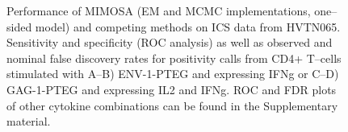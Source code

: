 \documentclass[11pt]{article}
\begin{document}
\begin{figure}[htbp] %
   \centering
   \caption{Performance of MIMOSA (EM and MCMC implementations, one--sided model) and competing methods on ICS data from HVTN065. Sensitivity and specificity (ROC analysis) as well as observed and nominal false discovery rates for positivity calls from CD4+ T--cells stimulated with A--B) ENV-1-PTEG and expressing IFNg or C--D) GAG-1-PTEG and expressing IL2 and IFNg. ROC and FDR plots of other cytokine combinations can be found in the Supplementary material.}
\label{fig:HVTN065}
\end{figure}

\end{document}
